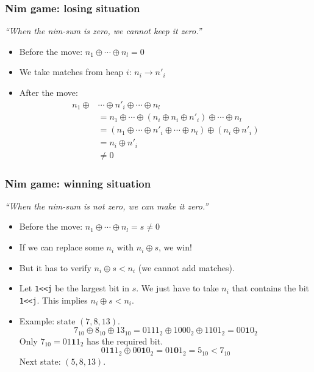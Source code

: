 \documentclass[12pt]{beamer}
\begin{document}
\begin{frame}
\frametitle{Nim game: losing situation}
\begin{center} \emph{``When the nim-sum is zero, we cannot keep it zero.''} \end{center}
\begin{itemize}
\item Before the move: $n_1 \oplus \cdots \oplus n_l = 0$
\item We take matches from heap $i$: $n_i \rightarrow n'_i$
\item After the move:
\begin{align*}
n_1 \oplus &\cdots \oplus n'_i \oplus \cdots \oplus n_l \\
&= n_1 \oplus \cdots \oplus (n_i \oplus n_i \oplus n'_i) \oplus \cdots \oplus n_l \\
&= (n_1 \oplus \cdots \oplus n'_i \oplus \cdots \oplus n_l) \oplus (n_i \oplus n'_i) \\
&= n_i \oplus n'_i \\
&\neq 0
\end{align*}
\end{itemize}
\end{frame}

\begin{frame}
\frametitle{Nim game: winning situation}
\begin{center} \emph{``When the nim-sum is not zero, we can make it zero.''} \end{center}
\begin{itemize}
\item Before the move: $n_1 \oplus \cdots \oplus n_l = s \neq 0$
\item If we can replace some $n_i$ with $n_i \oplus s$, we win!
\item But it has to verify $n_i \oplus s < n_i$ (we cannot add matches).
\item Let \lstinline|1<<j| be the largest bit in $s$. We just have to take $n_i$ that contains the bit \lstinline|1<<j|. This implies $n_i \oplus s < n_i$.
\item Example: state $(7,8,13)$.
\[7_{10} \oplus 8_{10} \oplus 13_{10} = 0111_2 \oplus 1000_2 \oplus 1101_2 = 00\mathbf{1}0_2\]
Only $7_{10}=01\mathbf{1}1_2$ has the required bit.
\[01\mathbf{1}1_2 \oplus 00\mathbf{1}0_2 = 01\mathbf{0}1_2 = 5_{10} < 7_{10}\]
Next state: $(5,8,13)$.
\end{itemize}
\end{frame}
\end{document}
